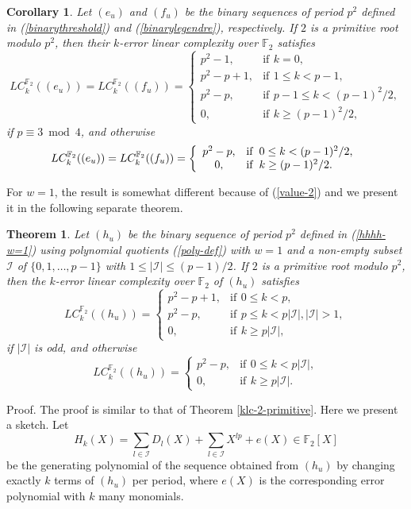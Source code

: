 \documentclass [11pt,a4paper]{article}
\def\F{\mathbb{F}}
\newtheorem{theorem}{Theorem}
\newtheorem{corollary}{Corollary}
\begin{document}
\begin{corollary}
Let $(e_u)$ and $(f_u)$ be the binary sequences of period $p^{2}$ defined in
(\ref{binarythreshold}) and (\ref{binarylegendre}), respectively. If $2$ is a primitive root modulo $p^2$, then
their $k$-error linear complexity  over $\F_2$ satisfies
\[
 LC^{\F_2}_k((e_u))=LC^{\F_2}_k((f_u))=\left\{
\begin{array}{cl}
p^2-1, & \mathrm{if}\,\ k=0, \\
p^2-p+1, & \mathrm{if}\,\ 1\le k<p-1, \\
p^2-p, & \mathrm{if}\,\ p-1\le k< (p-1)^2/2, \\
0, & \mathrm{if}\,\ k\ge (p-1)^2/2,
\end{array}
\right.
\]
if $p \equiv 3 \bmod 4$, and otherwise
\[
LC^{\F_2}_k((e_u))=LC^{\F_2}_k((f_u))=\left\{
\begin{array}{cl}
p^2-p, & \mathrm{if}\,\ 0\le k<(p-1)^2/2, \\
0, & \mathrm{if}\,\ k\ge (p-1)^2/2.
\end{array}
\right.\\
\]
\end{corollary}



For $w=1$, the result is somewhat different because of (\ref{value-2}) and we present it in the following separate
theorem.


\begin{theorem}\label{klc-2-primitive-w=1}
Let $(h_u)$ be the binary sequence of period $p^{2}$ defined in (\ref{hhhh-w=1}) using polynomial quotients (\ref{poly-def}) with $w=1$ and a non-empty subset $\mathcal{I}$ of $\{0,1,\ldots,p-1\}$ with $1\le |\mathcal{I}|\le (p-1)/2$. If $2$ is a primitive root modulo $p^2$, then
the $k$-error linear complexity  over $\F_2$ of $(h_u)$  satisfies
\[
 LC^{\F_2}_k((h_u))=\left\{
\begin{array}{cl}
p^2-p+1, & \mathrm{if}\,\ 0\le k<p, \\
p^2-p, & \mathrm{if}\,\ p\le k< p|\mathcal{I}|, |\mathcal{I}|>1,\\
0, & \mathrm{if}\,\ k\ge p|\mathcal{I}|,
\end{array}
\right.
\]
if $|\mathcal{I}|$ is odd, and otherwise
\[
 LC^{\F_2}_k((h_u))=\left\{
\begin{array}{cl}
p^2-p, & \mathrm{if}\,\ 0\le k<p|\mathcal{I}|, \\
0, & \mathrm{if}\,\ k\ge p|\mathcal{I}|.
\end{array}
\right.
\]
\end{theorem}
Proof. The proof is similar to that of Theorem \ref{klc-2-primitive}. Here we present a sketch. Let
$$
H_k(X)=\sum\limits_{l\in \mathcal{I}}D_{l}(X)+\sum\limits_{l\in \mathcal{I}}X^{lp}+e(X)\in \F_2[X]
$$
be the generating polynomial of the sequence obtained from $(h_u)$ by changing exactly $k$ terms of $(h_u)$ per period,
where $e(X)$ is the corresponding error polynomial with $k$ many  monomials.
\end{document}

